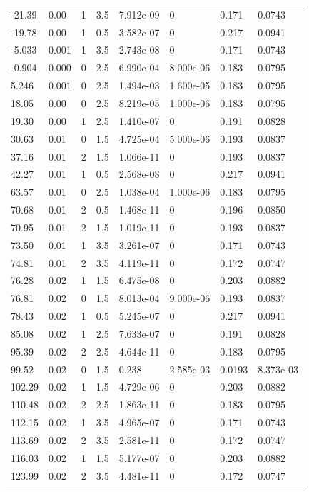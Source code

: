 \documentclass[preview]{standalone}
\begin{document}
{{\begin{tabular}{L{1.2cm}C{1.2cm} C{0.3cm}C{0.5cm} C{1.4cm}C{1.4cm} C{1.4cm}C{1.4cm}}
  -21.39  &  0.00  & 1     & 3.5 &  7.912e-09  & 0  & 0.171 &  0.0743   \\ 
  -19.78  &  0.00  & 1     & 0.5 &  3.582e-07  & 0  & 0.217 &  0.0941   \\ 
  -5.033  &  0.001  & 1     & 3.5 &  2.743e-08  & 0  & 0.171 &  0.0743   \\ 
  -0.904  &  0.000  & 0     & 2.5 &  6.990e-04  & 8.000e-06  & 0.183 &  0.0795   \\ 
  5.246  &  0.001  & 0     & 2.5 &  1.494e-03  & 1.600e-05  & 0.183 &  0.0795   \\ 
  18.05  &  0.00  & 0     & 2.5 &  8.219e-05  & 1.000e-06  & 0.183 &  0.0795   \\ 
  19.30  &  0.00  & 1     & 2.5 &  1.410e-07  & 0  & 0.191 &  0.0828   \\ 
  30.63  &  0.01  & 0     & 1.5 &  4.725e-04  & 5.000e-06  & 0.193 &  0.0837   \\ 
  37.16  &  0.01  & 2     & 1.5 &  1.066e-11  & 0  & 0.193 &  0.0837   \\ 
  42.27  &  0.01  & 1     & 0.5 &  2.568e-08  & 0  & 0.217 &  0.0941   \\ 
  63.57  &  0.01  & 0     & 2.5 &  1.038e-04  & 1.000e-06  & 0.183 &  0.0795   \\ 
  70.68  &  0.01  & 2     & 0.5 &  1.468e-11  & 0  & 0.196 &  0.0850   \\ 
  70.95  &  0.01  & 2     & 1.5 &  1.019e-11  & 0  & 0.193 &  0.0837   \\ 
  73.50  &  0.01  & 1     & 3.5 &  3.261e-07  & 0  & 0.171 &  0.0743   \\ 
  74.81  &  0.01  & 2     & 3.5 &  4.119e-11  & 0  & 0.172 &  0.0747   \\ 
  76.28  &  0.02  & 1     & 1.5 &  6.475e-08  & 0  & 0.203 &  0.0882   \\ 
  76.81  &  0.02  & 0     & 1.5 &  8.013e-04  & 9.000e-06  & 0.193 &  0.0837   \\ 
  78.43  &  0.02  & 1     & 0.5 &  5.245e-07  & 0  & 0.217 &  0.0941   \\ 
  85.08  &  0.02  & 1     & 2.5 &  7.633e-07  & 0  & 0.191 &  0.0828   \\ 
  95.39  &  0.02  & 2     & 2.5 &  4.644e-11  & 0  & 0.183 &  0.0795   \\ 
  99.52  &  0.02  & 0     & 1.5 &  0.238  & 2.585e-03  & 0.0193 &  8.373e-03   \\ 
  102.29  &  0.02  & 1     & 1.5 &  4.729e-06  & 0  & 0.203 &  0.0882   \\ 
  110.48  &  0.02  & 2     & 2.5 &  1.863e-11  & 0  & 0.183 &  0.0795   \\ 
  112.15  &  0.02  & 1     & 3.5 &  4.965e-07  & 0  & 0.171 &  0.0743   \\ 
  113.69  &  0.02  & 2     & 3.5 &  2.581e-11  & 0  & 0.172 &  0.0747   \\ 
  116.03  &  0.02  & 1     & 1.5 &  5.177e-07  & 0  & 0.203 &  0.0882   \\ 
  123.99  &  0.02  & 2     & 3.5 &  4.481e-11  & 0  & 0.172 &  0.0747   \\ 
\hline 
\end{tabular} 

}}
\end{document}
